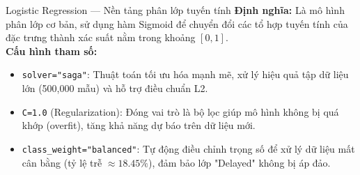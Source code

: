 
\begin{frame}{Logistic Regression --- Nền tảng phân lớp tuyến tính}
  \textbf{Định nghĩa:} Là mô hình phân lớp cơ bản, sử dụng hàm Sigmoid để chuyển đổi các tổ hợp tuyến tính của đặc trưng thành xác suất nằm trong khoảng $[0, 1]$.
  \vspace{2mm}
  \\
  \textbf{Cấu hình tham số:}
  \begin{itemize}
    \item \texttt{solver="saga"}: Thuật toán tối ưu hóa mạnh mẽ, xử lý hiệu quả tập dữ liệu lớn (500,000 mẫu) và hỗ trợ điều chuẩn L2.
    \item \texttt{C=1.0} (Regularization): Đóng vai trò là bộ lọc giúp mô hình không bị quá khớp (overfit), tăng khả năng dự báo trên dữ liệu mới.
    \item \texttt{class\_weight="balanced"}: Tự động điều chỉnh trọng số để xử lý dữ liệu mất cân bằng (tỷ lệ trễ $\approx 18.45\%$), đảm bảo lớp "Delayed" không bị áp đảo.
  \end{itemize}
\end{frame}

